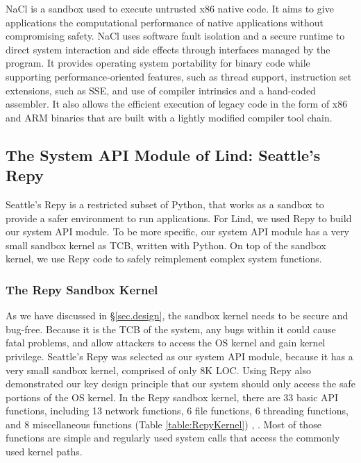 NaCl is a sandbox used to execute untrusted x86 native code. 
It aims to give applications the computational performance of native applications without compromising safety. 
NaCl uses software fault isolation and a secure runtime to direct system interaction and 
side effects through interfaces managed by the program. It provides operating system portability 
for binary code while supporting performance-oriented features, such as thread support, 
instruction set extensions, such as SSE, and use of compiler intrinsics and a hand-coded assembler. 
It also allows the efficient execution of legacy code in the form of x86 and ARM binaries 
that are built with a lightly modified compiler tool chain. 

\subsection{The System API Module of Lind: Seattle's Repy}

Seattle's Repy \cite{Repy-10} is a restricted subset of Python, that works as a sandbox to provide a safer environment 
to run applications. For Lind, we used Repy to build our system API module. 
To be more specific, our system API module has a very small sandbox kernel as TCB,  
written with Python. On top of the sandbox kernel, 
we use Repy code to safely reimplement complex system functions.

\subsubsection{The Repy Sandbox Kernel}

As we have discussed in \S{\ref{sec.design}}, the sandbox kernel needs to be secure and bug-free. 
Because it is the TCB of the system, any bugs within it could cause fatal problems, 
and allow attackers to access the OS kernel and gain kernel privilege. 
Seattle's Repy was selected as our system API module, because it has a very small sandbox kernel, 
comprised of only 8K LOC. Using Repy also demonstrated our key design principle that 
our system should only access the safe portions of the OS kernel. In the Repy sandbox kernel, 
there are 33 basic API functions, including 13 network functions, 6 file functions, 6 threading functions, 
and 8 miscellaneous functions (Table \ref{table:RepyKernel}) \cite{Repy-10}, \cite{RepyKernel}. Most of those functions are simple and 
regularly used system calls that access the commonly used kernel paths. 

